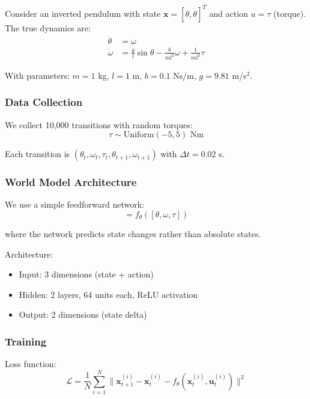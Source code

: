 Consider an inverted pendulum with state $\mathbf{x} = [\theta, \dot{\theta}]^T$ and action $u = \tau$ (torque). The true dynamics are:
\begin{align}
\dot{\theta} &= \omega \\
\dot{\omega} &= \frac{g}{l}\sin\theta - \frac{b}{ml^2}\omega + \frac{1}{ml^2}\tau
\end{align}

With parameters: $m = 1$ kg, $l = 1$ m, $b = 0.1$ Ns/m, $g = 9.81$ m/s$^2$.

\subsubsection{Data Collection}

We collect 10,000 transitions with random torques:
\begin{equation}
\tau \sim \text{Uniform}(-5, 5) \text{ Nm}
\end{equation}

Each transition is $(\theta_t, \omega_t, \tau_t, \theta_{t+1}, \omega_{t+1})$ with $\Delta t = 0.02$ s.

\subsubsection{World Model Architecture}

We use a simple feedforward network:
\begin{equation}
[\Delta\theta, \Delta\omega] = f_\theta([\theta, \omega, \tau])
\end{equation}

where the network predicts state changes rather than absolute states.

Architecture:
\begin{itemize}
    \item Input: 3 dimensions (state + action)
    \item Hidden: 2 layers, 64 units each, ReLU activation
    \item Output: 2 dimensions (state delta)
\end{itemize}

\subsubsection{Training}

Loss function:
\begin{equation}
\mathcal{L} = \frac{1}{N}\sum_{i=1}^N \| \mathbf{x}_{t+1}^{(i)} - \mathbf{x}_t^{(i)} - f_\theta(\mathbf{x}_t^{(i)}, \mathbf{u}_t^{(i)}) \|^2
\end{equation}

